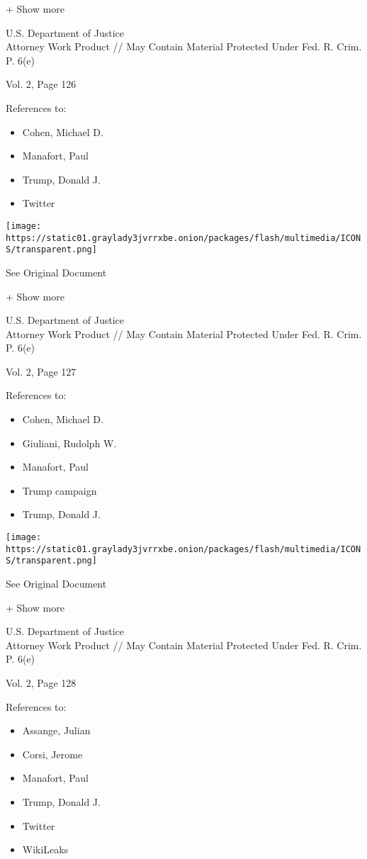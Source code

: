 + Show more

U.S. Department of Justice\\
Attorney Work Product // May Contain Material Protected Under Fed. R.
Crim. P. 6(e)

Vol. 2, Page 126

References to:

\begin{itemize}
\tightlist
\item
  Cohen, Michael D.
\item
  Manafort, Paul 
\item
  Trump, Donald J.
\item
  Twitter
\end{itemize}

\protect\hyperlink{}{}

\texttt{[image: https://static01.graylady3jvrrxbe.onion/packages/flash/multimedia/ICONS/transparent.png]}

See Original Document

+ Show more

U.S. Department of Justice\\
Attorney Work Product // May Contain Material Protected Under Fed. R.
Crim. P. 6(e)

Vol. 2, Page 127

References to:

\begin{itemize}
\tightlist
\item
  Cohen, Michael D.
\item
  Giuliani, Rudolph W.
\item
  Manafort, Paul 
\item
  Trump campaign
\item
  Trump, Donald J.
\end{itemize}

\protect\hyperlink{}{}

\texttt{[image: https://static01.graylady3jvrrxbe.onion/packages/flash/multimedia/ICONS/transparent.png]}

See Original Document

+ Show more

U.S. Department of Justice\\
Attorney Work Product // May Contain Material Protected Under Fed. R.
Crim. P. 6(e)

Vol. 2, Page 128

References to:

\begin{itemize}
\tightlist
\item
  Assange, Julian
\item
  Corsi, Jerome
\item
  Manafort, Paul 
\item
  Trump, Donald J.
\item
  Twitter
\item
  WikiLeaks
\end{itemize}

